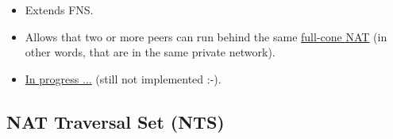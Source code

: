 \documentclass{article}
\begin{document}
\begin{itemize}
\item Extends FNS.
\item Allows that two or more peers can run behind the same
  \href{http://en.wikipedia.org/wiki/Network_address_translation}{full-cone
    NAT} (in other words, that are in the same private network).
\item
  \href{http://www.p2psp.org/en/p2psp-protocol?cap=indexsu12.xht#x20-170004.12}{In
    progress ...} (still not implemented :-).
\end{itemize}

\ifx \HCode\Undfef
\else
{}
\fi


\subsection{NAT Traversal Set (NTS)}

\ifx \HCode\Undfef
\else
{}
\fi
\end{document}
